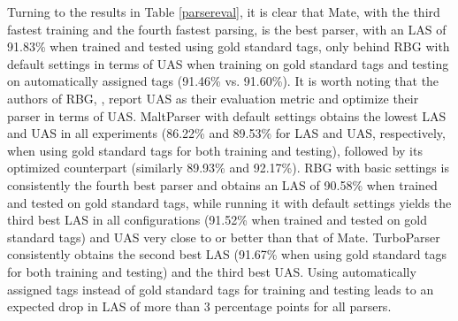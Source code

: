 \documentclass[a4paper,12pt,english]{book}
\begin{document}
Turning to the results in Table \ref{parsereval}, it is clear that Mate, with
the third fastest training and the fourth fastest parsing, is the best parser,
with an LAS of 91.83\% when trained and tested using gold standard tags, only
behind RBG with default settings in terms of UAS when training on gold standard
tags and testing on automatically assigned tags (91.46\% vs.  91.60\%). It is
worth noting that the authors of RBG, , report UAS as
their evaluation metric and optimize their parser in terms of UAS. MaltParser
with default settings obtains the lowest LAS and UAS in all experiments
(86.22\% and 89.53\% for LAS and UAS, respectively, when using gold standard
tags for both training and testing), followed by its optimized counterpart
(similarly 89.93\% and 92.17\%). RBG with basic settings is consistently the
fourth best parser and obtains an LAS of 90.58\% when trained and tested on
gold standard tags, while running it with default settings yields the third
best LAS in all configurations (91.52\% when trained and tested on gold
standard tags) and UAS very close to or better than that of Mate. TurboParser
consistently obtains the second best LAS (91.67\% when using gold standard tags
for both training and testing) and the third best UAS. Using automatically
assigned tags instead of gold standard tags for training and testing leads to
an expected drop in LAS of more than 3 percentage points for all parsers.
\end{document}
